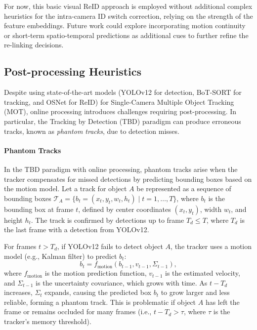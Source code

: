 \documentclass[12pt, a4paper]{article}
\begin{document}
For now, this basic visual ReID approach is employed without additional complex heuristics for the intra-camera ID switch correction, relying on the strength of the feature embeddings. Future work could explore incorporating motion continuity or short-term spatio-temporal predictions as additional cues to further refine the re-linking decisions.



























\subsection{Post-processing Heuristics}

Despite using state-of-the-art models (YOLOv12 for detection, BoT-SORT for tracking, and OSNet for ReID) for Single-Camera Multiple Object Tracking (MOT), online processing introduces challenges requiring post-processing. In particular, the Tracking by Detection (TBD) paradigm can produce erroneous tracks, known as \textit{phantom tracks}, due to detection misses.

\paragraph{Phantom Tracks}
In the TBD paradigm with online processing, phantom tracks arise when the tracker compensates for missed detections by predicting bounding boxes based on the motion model. Let a track for object $A$ be represented as a sequence of bounding boxes $\mathcal{T}_A = \{b_t = (x_t, y_t, w_t, h_t) \mid t = 1, \dots, T\}$, where $b_t$ is the bounding box at frame $t$, defined by center coordinates $(x_t, y_t)$, width $w_t$, and height $h_t$. The track is confirmed by detections up to frame $T_d \leq T$, where $T_d$ is the last frame with a detection from YOLOv12.

For frames $t > T_d$, if YOLOv12 fails to detect object $A$, the tracker uses a motion model (e.g., Kalman filter) to predict $b_t$:
\[
b_t = f_{\text{motion}}(b_{t-1}, v_{t-1}, \Sigma_{t-1}),
\]
where $f_{\text{motion}}$ is the motion prediction function, $v_{t-1}$ is the estimated velocity, and $\Sigma_{t-1}$ is the uncertainty covariance, which grows with time. As $t - T_d$ increases, $\Sigma_t$ expands, causing the predicted box $b_t$ to grow larger and less reliable, forming a phantom track. This is problematic if object $A$ has left the frame or remains occluded for many frames (i.e., $t - T_d > \tau$, where $\tau$ is the tracker's memory threshold).
\end{document}
